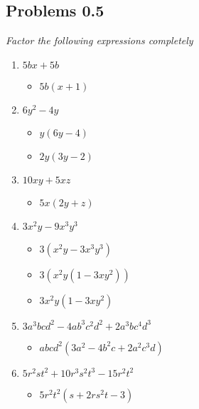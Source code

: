 \documentclass{article}
\begin{document}
\begin{onehalfspace}
    \section{Problems 0.5}

    \textit{Factor the following expressions completely}

    \begin{enumerate}
        \item $5bx + 5b$
        \begin{itemize}
            \item $5b(x + 1)$
        \end{itemize}

        \item $6y^{2} - 4y$
        \begin{itemize}
            \item $y(6y - 4)$
            \item $2y(3y - 2)$
        \end{itemize}

        \item $10xy + 5xz$
        \begin{itemize}
            \item $5x(2y + z)$
        \end{itemize}

        \item $3x^{2}y - 9x^{3}y^{3}$
        \begin{itemize}
            \item $3(x^{2}y - 3x^{3}y^{3})$
            \item $3(x^{2}y(1 - 3xy^{2}))$
            \item $3x^{2}y(1 - 3xy^{2})$
        \end{itemize}

        \item $3a^{3}bcd^{2} - 4ab^{3}c^{2}d^{2} + 2a^{3}bc^{4}d^{3}$
        \begin{itemize}
            \item $abcd^{2}(3a^{2} - 4b^{2}c + 2a^{2}c^{3}d)$
        \end{itemize}

        \item $5r^{2}st^{2} + 10r^{3}s^{2}t^{3} - 15r^{2}t^{2}$
        \begin{itemize}
            \item $5r^{2}t^{2}(s + 2rs^{2}t - 3)$
        \end{itemize}


\end{enumerate}
\end{onehalfspace}
\end{document}
